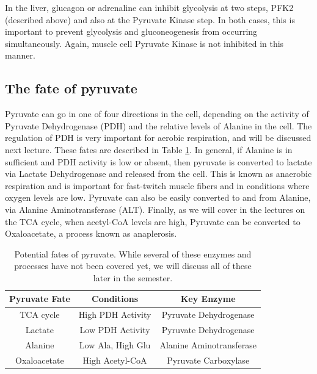 \documentclass{tufte-handout}
\begin{document}
  In the liver, glucagon or adrenaline can inhibit glycolysis at two steps, PFK2 (described above) and also at the Pyruvate Kinase step.  In both cases, this is important to prevent glycolysis and gluconeogenesis from occurring simultaneously.  Again, muscle cell Pyruvate Kinase is not inhibited in this manner.

\subsection{The fate of pyruvate}

Pyruvate can go in one of four directions in the cell, depending on the activity of Pyruvate Dehydrogenase (PDH) and the relative levels of Alanine in the cell.  The regulation of PDH is very important for aerobic respiration, and will be discussed next lecture.  These fates are described in Table \ref{tab:pyruvate-fates}.  In general, if Alanine is in sufficient and PDH activity is low or absent, then pyruvate is converted to lactate via Lactate Dehydrogenase and released from the cell.  This is known as anaerobic respiration and is important for fast-twitch muscle fibers and in conditions where oxygen levels are low.  Pyruvate can also be easily converted to and from Alanine, via Alanine Aminotransferase (ALT).  Finally, as we will cover in the lectures on the TCA cycle, when acetyl-CoA levels are high, Pyruvate can be converted to Oxaloacetate, a process known as anaplerosis.

\begin{table}
\centering
\caption{Potential fates of pyruvate.  While several of these enzymes and processes have not been covered yet, we will discuss all of these later in the semester.}
\label{tab:pyruvate-fates}
\begin{tabular}{ccc}
\hline
\textbf {Pyruvate Fate} & \textbf{Conditions}  & \textbf{Key Enzyme} \\
\hline
TCA cycle & High PDH Activity & Pyruvate Dehydrogenase \\
Lactate & Low PDH Activity & Pyruvate Dehydrogenase \\
Alanine & Low Ala, High Glu & Alanine Aminotransferase\\
Oxaloacetate & High Acetyl-CoA & Pyruvate Carboxylase \\
\hline
\end{tabular}
\end{table}
\end{document}
